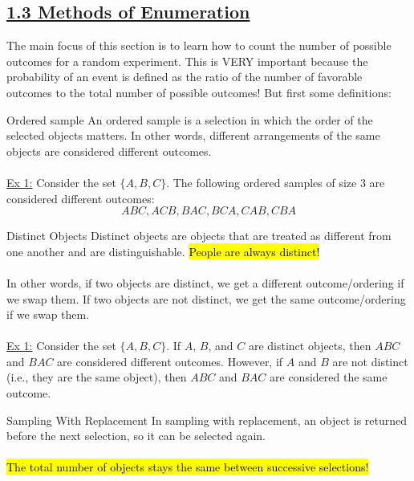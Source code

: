 ﻿\documentclass[12pt]{article}
\begin{document}
\subsection*{\underline{1.3 Methods of Enumeration}}
The main focus of this section is to learn how to count the number of possible outcomes for a random experiment. This is VERY important because the probability of an event is defined as the ratio of the number of favorable outcomes to the total number of possible outcomes! But first some definitions:
\begin{definition}{Ordered sample}
    An ordered sample is a selection in which the order of the selected objects matters. In other words, different arrangements of the same objects are considered different outcomes.\\\\
    \underline{Ex 1:} Consider the set $\{A, B, C\}$. The following ordered samples of size 3 are considered different outcomes:
    \[ABC, ACB, BAC, BCA, CAB, CBA\]
\end{definition}

\begin{definition}{Distinct Objects}
   Distinct objects are objects that are treated as different from one another and are distinguishable. \hl{People are always distinct!}\\\\
    In other words, if two objects are distinct, we get a different outcome/ordering if we swap them. If two objects are not distinct, we get the same outcome/ordering if we swap them.\\\\
    \underline{Ex 1:} Consider the set $\{A, B, C\}$. If $A$, $B$, and $C$ are distinct objects, then $ABC$ and $BAC$ are considered different outcomes. However, if $A$ and $B$ are not distinct (i.e., they are the same object), then $ABC$ and $BAC$ are considered the same outcome.
\end{definition}

\begin{definition}{Sampling With Replacement}
    In sampling with replacement, an object is returned before the next selection, so it can be selected again.\\\\
    \hl{The total number of objects stays the same between successive selections!}
\end{definition}
\end{document}
